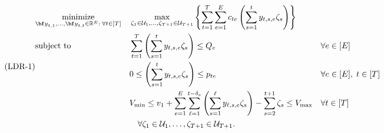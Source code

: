 \documentclass[nonblindrev,mnsc]{informs3} %
\newcommand{\by}{{\bf y}}
\def\Real{\mathbb{R}}
\let\R\Real
\begin{document}
  \begin{equation} \label{prob:ldr_1} \tag{\textnormal{LDR-1}}
    \begin{aligned}
      & \underset{\by_{t,1},\ldots,\by_{t,t} \in \R^E:\;  \forall t \in [T]}{\textnormal{minimize}}&&\max_{\zeta_1 \in \mathcal{U}_1,\ldots,\zeta_{T+1} \in \mathcal{U}_{T+1}} \left \{ \sum_{t=1}^T \sum_{e=1}^E c_{te}  \left( \sum_{s=1}^{t} y_{t,s,e} \zeta_s \right)  \right \} \\ 
    &\textnormal{subject to}&& \sum_{t=1}^T  \left( \sum_{s=1}^t y_{t,s,e} \zeta_s \right) \le  Q_e &&  \forall e \in[E] \\
   &&& 0 \le \left( \sum_{s=1}^t y_{t,s,e} \zeta_s \right) \le  p_{te} && \forall  e\in[E],\; t \in [T]\\
   &&&V_{\textnormal{min}} \le  v_1 +  \sum_{e=1}^E \sum_{\ell=1}^{t-\delta_e} \left( \sum_{s=1}^\ell y_{\ell,s,e} \zeta_s \right)  - \sum_{s=2}^{t+1} \zeta_s  \le  V_{\textnormal{max}}&& \forall  t \in [T]\\
   &&& \quad \forall \zeta_1 \in \mathcal{U}_1,\ldots,\zeta_{T+1} \in \mathcal{U}_{T+1}.
    \end{aligned}
  \end{equation} 
\end{document}
